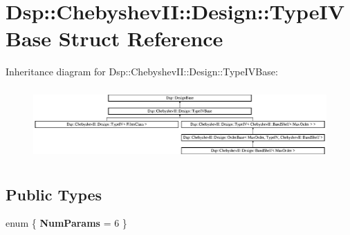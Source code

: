 \hypertarget{structDsp_1_1ChebyshevII_1_1Design_1_1TypeIVBase}{\section{Dsp\-:\-:Chebyshev\-I\-I\-:\-:Design\-:\-:Type\-I\-V\-Base Struct Reference}
\label{structDsp_1_1ChebyshevII_1_1Design_1_1TypeIVBase}
}
Inheritance diagram for Dsp\-:\-:Chebyshev\-I\-I\-:\-:Design\-:\-:Type\-I\-V\-Base\-:\begin{figure}[H]
\begin{center}
\leavevmode
\includegraphics[height=2.772277cm]{structDsp_1_1ChebyshevII_1_1Design_1_1TypeIVBase}
\end{center}
\end{figure}
\subsection*{Public Types}
\begin{DoxyCompactItemize}
\item 
enum \{ {\bfseries Num\-Params} =  6
 \}
\end{DoxyCompactItemize}
